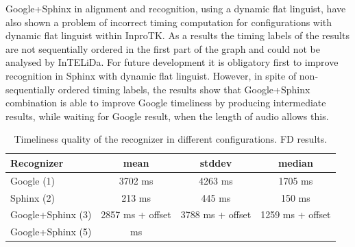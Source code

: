 Google+Sphinx in alignment and recognition, using a dynamic flat linguist, have
also shown a problem of incorrect timing computation for configurations with
dynamic flat linguist within InproTK. As a results the timing labels of the
results are not sequentially ordered in the first part of the graph and could
not be analysed by InTELiDa. For future development it is obligatory first to
improve recognition in Sphinx with dynamic flat linguist.  However, in spite of
non-sequentially ordered timing labels, the results show that Google+Sphinx
combination is able to improve Google timeliness by producing intermediate
results, while waiting for Google result, when the length of audio allows this. 
\begin {table}
\begin{center}
\caption {Timeliness quality of the recognizer in different configurations. FD
results.}
    \begin{tabular}{ l  c  c  c }
    \toprule
    Recognizer & mean & stddev & median \\ \toprule
    Google (1)  & 3702 ms & 4263 ms & 1705 ms  \\ 
    Sphinx (2)  & 213 ms & 445 ms & 150 ms \\ 
    Google+Sphinx (3)  & 2857 ms + offset & 3788 ms + 
    offset   & 1259 ms + offset \\
    Google+Sphinx (5)  & ms  & &\\ \bottomrule   
    \end{tabular}
    \label{tab:FD} 
\end{center}
\end {table}

